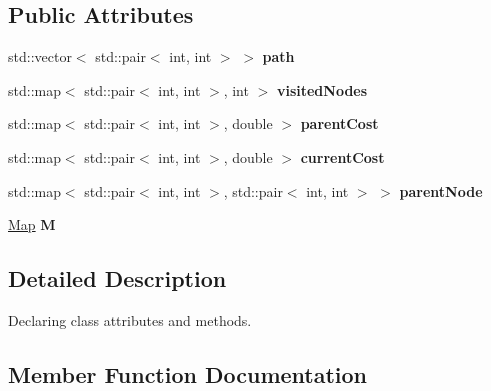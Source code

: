 \subsection*{Public Attributes}
\begin{DoxyCompactItemize}
\item 
\mbox{\label{classOptimalPlanner_ae4f61f83a93f6c8f53c58019eaca80a9}} 
std\+::vector$<$ std\+::pair$<$ int, int $>$ $>$ {\bfseries path}
\item 
\mbox{\label{classOptimalPlanner_abbbd1f7008cd82bf189dd573868493fc}} 
std\+::map$<$ std\+::pair$<$ int, int $>$, int $>$ {\bfseries visited\+Nodes}
\item 
\mbox{\label{classOptimalPlanner_a819dec74f42967461d386818bc7529ae}} 
std\+::map$<$ std\+::pair$<$ int, int $>$, double $>$ {\bfseries parent\+Cost}
\item 
\mbox{\label{classOptimalPlanner_ae0c4420e7e17f454e8dee52cb527007f}} 
std\+::map$<$ std\+::pair$<$ int, int $>$, double $>$ {\bfseries current\+Cost}
\item 
\mbox{\label{classOptimalPlanner_ad89f362b4efc6ab0a8aab16db7606137}} 
std\+::map$<$ std\+::pair$<$ int, int $>$, std\+::pair$<$ int, int $>$ $>$ {\bfseries parent\+Node}
\item 
\mbox{\label{classOptimalPlanner_af052dee02cef52afaf45ca57e728c83d}} 
\mbox{\hyperlink{classMap}{Map}} {\bfseries M}
\end{DoxyCompactItemize}


\subsection{Detailed Description}
Declaring class attributes and methods. 

\subsection{Member Function Documentation}
\mbox{\label{classOptimalPlanner_ab32e5f5dc1b4b599df70cc058701f2e8}} 
